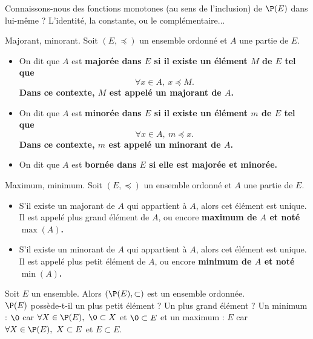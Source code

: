 \documentclass[11pt]{article}
\begin{document}
\begin{ex}{}{}
    Connaissons-nous des fonctions monotones (au sens de l'inclusion) de $\P(E)$ dans lui-même ?
    \tcblower
    L'identité, la constante, ou le complémentaire...
\end{ex}

\begin{defi}{Majorant, minorant.}{}
    Soit $(E,\preceq)$ un ensemble ordonné et $A$ une partie de $E$.
    \begin{itemize}
        \item On dit que $A$ est \bf{majorée} dans $E$ si il existe un élément $M$ de $E$ tel que
        \begin{equation*}
            \forall x \in A, ~ x \preceq M.
        \end{equation*}
        Dans ce contexte, $M$ est appelé un \bf{majorant} de $A$.
        \item On dit que $A$ est \bf{minorée} dans $E$ si il existe un élément $m$ de $E$ tel que
        \begin{equation*}
            \forall x \in A, ~ m \preceq x.
        \end{equation*}
        Dans ce contexte, $m$ est appelé un \bf{minorant} de $A$.
        \item On dit que $A$ est \bf{bornée} dans $E$ si elle est majorée et minorée.
    \end{itemize}
\end{defi}

\begin{defi}{Maximum, minimum.}{}
    Soit $(E,\preceq)$ un ensemble ordonné et $A$ une partie de $E$.
    \begin{itemize}
        \item S'il existe un majorant de $A$ qui appartient à $A$, alors cet élément est unique.\\
        Il est appelé plus grand élément de $A$, ou encore \bf{maximum} de $A$ et noté $\max(A)$.
        \item S'il existe un minorant de $A$ qui appartient à $A$, alors cet élément est unique.\\
        Il est appelé plus petit élément de $A$, ou encore \bf{minimum} de $A$ et noté $\min(A)$.
    \end{itemize}
\end{defi}

\begin{ex}{}{}
    Soit $E$ un ensemble. Alors $(\P(E),\subset)$ est un ensemble ordonnée.\\
    $\P(E)$ possède-t-il un plus petit élément ? Un plus grand élément ?
    \tcblower
    Un minimum : $\0$ car $\forall X \in \P(E), ~ \0 \subset X$ et $\0\subset E$ et un maximum : $E$ car $\forall X \in \P(E), ~ X \subset E$ et $E\subset E$.
\end{ex}
\end{document}
